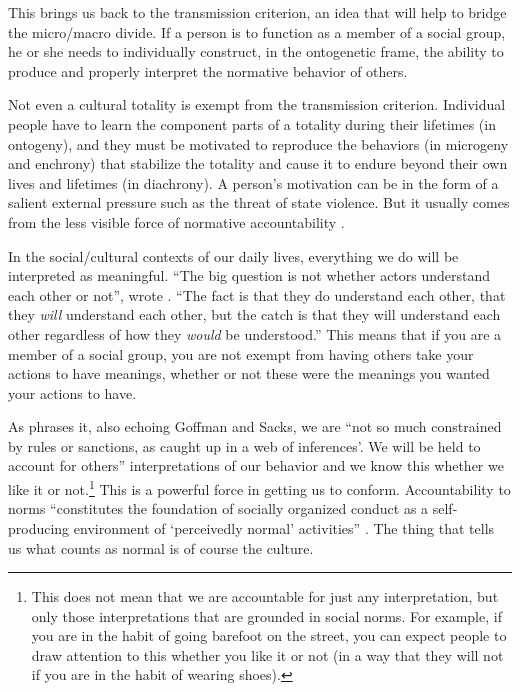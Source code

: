 This brings us back to the transmission criterion, an idea that will help to bridge the micro/macro divide. If a person is to function as a member of a social group, he or she needs to individually construct, in the ontogenetic frame, the ability to produce and properly interpret the normative behavior of others. 



Not even a cultural totality is exempt from the transmission criterion. 
Individual people have to learn the component parts of a totality during 
their lifetimes (in ontogeny), and they must be motivated to reproduce the behaviors 
(in microgeny and enchrony) that stabilize the totality and cause it to endure beyond their own 
lives and lifetimes (in diachrony). A person's motivation can be in the form of a
salient external pressure such as the threat of state violence. But it usually comes from the less visible force of normative accountability \citep{heritage_garfinkel_1984,enfield_relationship_2013}. 



In the social/cultural contexts of our daily lives, everything we do will be interpreted as meaningful. ``The big question is not whether 
actors understand each other or not'', wrote \citet[367]{garfinkel_perception_1952}. ``The fact is that they do understand each other, 
that they \textit{will} understand each other, but the catch is that 
they will understand each other regardless of how they \textit{would} 
be understood.'' This means that if you are a member of a social group, you are not 
exempt from having others take your actions to have meanings, whether or 
not these were the meanings you wanted your actions to have. 



As \citet[321]{levinson_pragmatics_1983} phrases it, also echoing Goffman and Sacks, we 
are ``not so much constrained by rules or sanctions, as caught up in a 
web of inferences'. We will be held to account for others''
interpretations of our behavior and we know this whether we like it or 
not.\footnote{This does not mean that we are accountable for just any interpretation, but only those interpretations that are grounded in social norms. For example, if you are in the habit of going barefoot on the street, you can expect people to draw attention to this whether you like it or not (in a way that they will not if you are in the habit of wearing shoes).} This is a powerful force in getting us to conform. Accountability 
to norms ``constitutes the foundation of socially organized conduct as a 
self-producing environment of `perceivedly normal' activities''
\citep[119]{heritage_garfinkel_1984}. The thing that tells us what counts as normal is of 
course the culture. 



